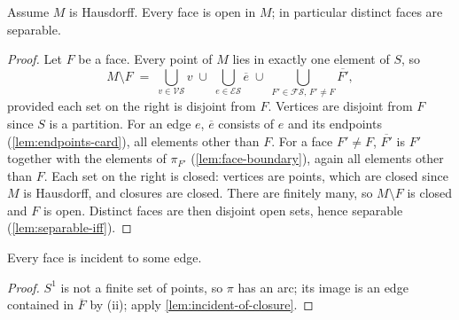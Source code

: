     \begin{lemma}\label{lem:faces-open}

      Assume $M$ is Hausdorff. Every face is open in $M$; in particular
      distinct faces are separable.
    \end{lemma}
    \begin{proof}

      Let $F$ be a face. Every point of $M$ lies in exactly one element of $S$,
      so
        \[
          M \setminus F \;=\; \bigcup_{v \in \mathscr{V}\mathscr{S}} v
            \;\cup\; \bigcup_{e \in \mathscr{E}\mathscr{S}} \overline{e}
            \;\cup\; \bigcup_{F' \in \mathscr{F}\mathscr{S},\, F' \neq F}
            \overline{F'},
        \]
        provided each set on the right is disjoint from $F$. Vertices are
        disjoint from $F$ since $S$ is a partition. For an edge $e$,
        $\overline{e}$ consists of $e$ and its endpoints
        (\cref{lem:endpoints-card}), all elements other than $F$. For a face
        $F' \neq F$, $\overline{F'}$ is $F'$ together with the elements of
        $\pi_{F'}$ (\cref{lem:face-boundary}), again all elements other than
        $F$. Each set on the right is closed: vertices are points, which are
        closed since $M$ is Hausdorff, and closures are closed. There are
        finitely many, so $M \setminus F$ is closed and $F$ is open. Distinct
        faces are then disjoint open sets, hence separable
        (\cref{lem:separable-iff}).
    \end{proof}

    \begin{lemma}\label{lem:face-incident-edge}

      Every face is incident to some edge.
    \end{lemma}
    \begin{proof}

      $S^1$ is not a finite set of points, so $\pi$ has an arc; its image is an
      edge contained in $\overline{F}$ by (ii); apply
      \cref{lem:incident-of-closure}.
    \end{proof}

